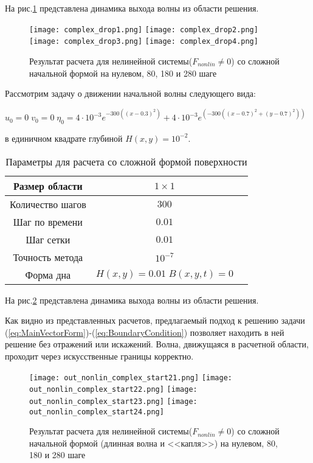 На рис.\ref{fig:ComplexDrop} представлена динамика выхода волны из области решения.

\newpage
\begin{figure}[htp]
    \centering
    \vspace{12em}
    \texttt{[image: complex\_drop1.png]}
    \texttt{[image: complex\_drop2.png]}
    \texttt{[image: complex\_drop3.png]}
    \texttt{[image: complex\_drop4.png]}
    \caption{Результат расчета для нелинейной системы($F_{nonlin}\neq 0$) со сложной начальной формой на нулевом, 80, 180 и 280 шаге}
    \label{fig:ComplexDrop}
\end{figure}

\newpage
Рассмотрим задачу о движении начальной волны следующего вида:

$u_0=0\;v_0=0\;\eta_0=4 \cdot 10^{-3}e^{-300 ((x-0.3)^2)}+4 \cdot 10^{-3}e^{(-300 ((x-0.7)^2+(y-0.7)^2))}$

в единичном квадрате глубиной $H(x,y)=10^{-2}$.

\begin{table}[H]
    \label{tab:FirstResult}
    \caption{Параметры для расчета со сложной формой поверхности}
    \begin{center}
	\begin{tabular}{|c|c|c|}
	    \hline
	    Размер области & $1\times1$\\
	    \hline
	    Количество шагов & $300$\\
	    \hline
	    Шаг по времени & $0.01$\\
	    \hline
	    Шаг сетки & $0.01$\\
	    \hline
	    Точность метода & $10^{-7}$\\
	    \hline
	    Форма дна & $H(x,y)=0.01\; B(x,y,t)=0$\\
	    \hline
	\end{tabular}
    \end{center}
\end{table}

На рис.\ref{fig:ComplexDrop2} представлена динамика выхода волны из области решения.

Как видно из представленных расчетов, предлагаемый подход к решению задачи (\ref{eq:MainVectorForm})-(\ref{eq:BoundaryCondition}) позволяет находить в ней решение без отражений или искажений. Волна, движущаяся в расчетной области, проходит через искусственные границы корректно.

\newpage
\begin{figure}[htp]
    \centering
    \vspace{12em}
    \texttt{[image: out\_nonlin\_complex\_start21.png]}
    \texttt{[image: out\_nonlin\_complex\_start22.png]}
    \texttt{[image: out\_nonlin\_complex\_start23.png]}
    \texttt{[image: out\_nonlin\_complex\_start24.png]}
    \caption{Результат расчета для нелинейной системы($F_{nonlin}\neq 0$) со сложной начальной формой (длинная волна и <<капля>>) на нулевом, 80, 180 и 280 шаге}
    \label{fig:ComplexDrop2}
\end{figure}

